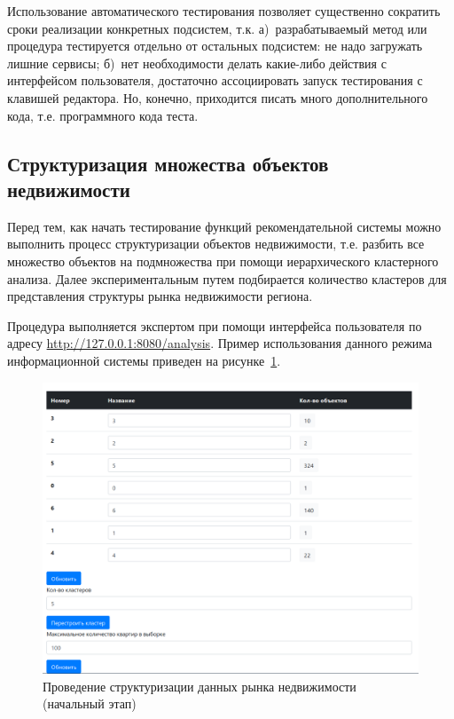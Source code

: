 \documentclass[a4paper,14pt,openany,final]{extreport} %
\begin{document}
{Использование автоматического тестирования позволяет существенно сократить сроки реализации конкретных подсистем, т.к. а)~разрабатываемый метод или процедура тестируется отдельно от остальных подсистем: не надо загружать лишние сервисы; б)~нет необходимости делать какие-либо действия с интерфейсом пользователя, достаточно ассоциировать запуск тестирования с клавишей редактора. Но, конечно, приходится писать много дополнительного кода, т.е. программного кода теста.

\subsection{Структуризация множества объектов недвижимости}
Перед тем, как начать тестирование функций рекомендательной системы можно выполнить процесс структуризации объектов недвижимости, т.е. разбить все множество объектов на подмножества при помощи иерархического кластерного анализа. Далее экспериментальным путем подбирается количество кластеров для представления структуры рынка недвижимости региона.

Процедура выполняется экспертом при помощи интерфейса пользователя по адресу \url{http://127.0.0.1:8080/analysis}. Пример использования данного режима информационной системы приведен на рисунке~\ref{fig:exclus1}.
\begin{figure}[htbp]
  \centering
  \includegraphics[width=0.8\linewidth]{screen-cluster-start.png}
  \caption{Проведение структуризации данных рынка недвижимости (начальный этап)}
  \label{fig:exclus1}
\end{figure}

}
\end{document}
